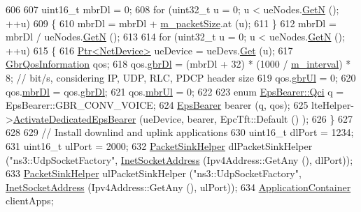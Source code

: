 \begin{DoxyCode}
606 
607   uint16\_t mbrDl = 0;
608   \textcolor{keywordflow}{for} (uint32\_t u = 0; u < ueNodes.\hyperlink{classns3_1_1NodeContainer_aed647ac56d0407a7706aba02eb44b951}{GetN} (); ++u)
609     \{
610       mbrDl = mbrDl + \hyperlink{classLenaFdTbfqFfMacSchedulerTestCase2_ad5516b67243721378cbc5af405181602}{m\_packetSize}.at (u);
611     \}
612   mbrDl = mbrDl / ueNodes.\hyperlink{classns3_1_1NodeContainer_aed647ac56d0407a7706aba02eb44b951}{GetN} (); 
613 
614   \textcolor{keywordflow}{for} (uint32\_t u = 0; u < ueNodes.\hyperlink{classns3_1_1NodeContainer_aed647ac56d0407a7706aba02eb44b951}{GetN} (); ++u)
615     \{
616       \hyperlink{classns3_1_1Ptr}{Ptr<NetDevice>} ueDevice = ueDevs.\hyperlink{classns3_1_1NetDeviceContainer_a677d62594b5c9d2dea155cc5045f4d0b}{Get} (u);
617       \hyperlink{structns3_1_1GbrQosInformation}{GbrQosInformation} qos;
618       qos.\hyperlink{structns3_1_1GbrQosInformation_a70b6106f5918d464d296bc23415ec801}{gbrDl} = (mbrDl + 32) * (1000 / \hyperlink{classLenaFdTbfqFfMacSchedulerTestCase2_a2f29ab8ea196fc6909becc1f291eb129}{m\_interval}) * 8;  \textcolor{comment}{// bit/s, considering IP, UDP,
       RLC, PDCP header size}
619       qos.\hyperlink{structns3_1_1GbrQosInformation_a8027f26c8fd5fd643d5af7a6a879860f}{gbrUl} = 0;
620       qos.\hyperlink{structns3_1_1GbrQosInformation_ac059dd3ad95475e8df63e52d9c2235e7}{mbrDl} = qos.\hyperlink{structns3_1_1GbrQosInformation_a70b6106f5918d464d296bc23415ec801}{gbrDl};
621       qos.\hyperlink{structns3_1_1GbrQosInformation_afce406e4f92771305075ace6cfe83e36}{mbrUl} = 0;
622   
623       \textcolor{keyword}{enum} \hyperlink{structns3_1_1EpsBearer_aecf0c67109c5eb4ec0b07226fff5885e}{EpsBearer::Qci} q = EpsBearer::GBR\_CONV\_VOICE;
624       \hyperlink{structns3_1_1EpsBearer}{EpsBearer} bearer (q, qos);
625       lteHelper->\hyperlink{classns3_1_1LteHelper_af28041edd4c96bde1a2e07c90e363dcc}{ActivateDedicatedEpsBearer} (ueDevice, bearer, EpcTft::Default ()
      );  
626     \}
627 
628 
629   \textcolor{comment}{// Install downlind and uplink applications}
630   uint16\_t dlPort = 1234;
631   uint16\_t ulPort = 2000;
632   \hyperlink{classns3_1_1PacketSinkHelper}{PacketSinkHelper} dlPacketSinkHelper (\textcolor{stringliteral}{"ns3::UdpSocketFactory"}, 
      \hyperlink{classns3_1_1InetSocketAddress}{InetSocketAddress} (Ipv4Address::GetAny (), dlPort));
633   \hyperlink{classns3_1_1PacketSinkHelper}{PacketSinkHelper} ulPacketSinkHelper (\textcolor{stringliteral}{"ns3::UdpSocketFactory"}, 
      \hyperlink{classns3_1_1InetSocketAddress}{InetSocketAddress} (Ipv4Address::GetAny (), ulPort));
634   \hyperlink{classns3_1_1ApplicationContainer}{ApplicationContainer} clientApps;

\end{DoxyCode}
